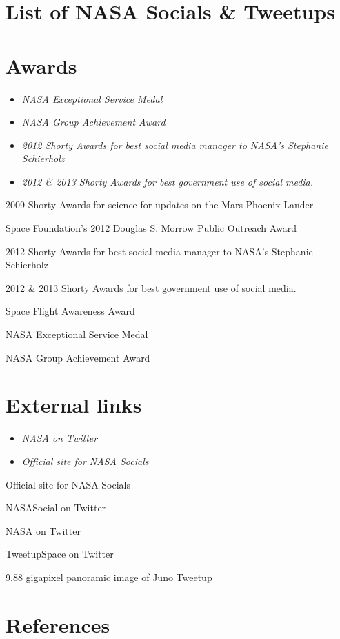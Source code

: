 \section{List of NASA Socials \&
Tweetups}\label{list-of-nasa-socials-tweetups}

\section{Awards}\label{awards}

\begin{itemize}
\item
  \emph{NASA Exceptional Service Medal}
\item
  \emph{NASA Group Achievement Award}
\item
  \emph{2012 Shorty Awards for best social media manager to NASA's
  Stephanie Schierholz}
\item
  \emph{2012 \& 2013 Shorty Awards for best government use of social
  media.}
\end{itemize}

2009 Shorty Awards for science for updates on the Mars Phoenix Lander

Space Foundation's 2012 Douglas S. Morrow Public Outreach Award

2012 Shorty Awards for best social media manager to NASA's Stephanie
Schierholz

2012 \& 2013 Shorty Awards for best government use of social media.

Space Flight Awareness Award

NASA Exceptional Service Medal

NASA Group Achievement Award

\section{External links}\label{external-links}

\begin{itemize}
\item
  \emph{NASA on Twitter}
\item
  \emph{Official site for NASA Socials}
\end{itemize}

Official site for NASA Socials

NASASocial on Twitter

NASA on Twitter

TweetupSpace on Twitter

9.88 gigapixel panoramic image of Juno Tweetup

\section{References}\label{references}

